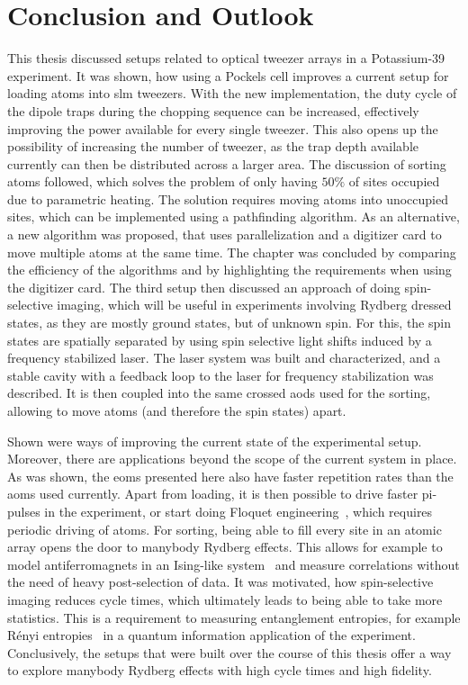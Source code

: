 \chapter{Conclusion and Outlook}

This thesis discussed setups related to optical tweezer arrays in a Potassium-39 experiment. It was shown, how using a Pockels cell improves a current setup for loading atoms into \ac{slm} tweezers. With the new implementation, the duty cycle of the dipole traps during the chopping sequence can be increased, effectively improving the power available for every single tweezer. This also opens up the possibility of increasing the number of tweezer, as the trap depth available currently can then be distributed across a larger area. The discussion of sorting atoms followed, which solves the problem of only having $50\%$ of sites occupied due to parametric heating. The solution requires moving atoms into unoccupied sites, which can be implemented using a pathfinding algorithm. As an alternative, a new algorithm was proposed, that uses parallelization and a digitizer card to move multiple atoms at the same time. The chapter was concluded by comparing the efficiency of the algorithms and by highlighting the requirements when using the digitizer card. The third setup then discussed an approach of doing spin-selective imaging, which will be useful in experiments involving Rydberg dressed states, as they are mostly ground states, but of unknown spin. For this, the spin states are spatially separated by using spin selective light shifts induced by a frequency stabilized laser. The laser system was built and characterized, and a stable cavity with a feedback loop to the laser for frequency stabilization was described. It is then coupled into the same crossed \acp{aod} used for the sorting, allowing to move atoms (and therefore the spin states) apart.

Shown were ways of improving the current state of the experimental setup. Moreover, there are applications beyond the scope of the current system in place. As was shown, the \acp{eom} presented here also have faster repetition rates than the \acp{aom} used currently. Apart from loading, it is then possible to drive faster pi-pulses in the experiment, or start doing Floquet engineering~\cite{Oka2019}, which requires periodic driving of atoms. For sorting, being able to fill every site in an atomic array opens the door to manybody Rydberg effects. This allows for example to model antiferromagnets in an Ising-like system~\cite{Lienhard2018} and measure correlations without the need of heavy post-selection of data. It was motivated, how spin-selective imaging reduces cycle times, which ultimately leads to being able to take more statistics. This is a requirement to measuring entanglement entropies, for example Rényi entropies~\cite{Wilde2014} in a quantum information application of the experiment. Conclusively, the setups that were built over the course of this thesis offer a way to explore manybody Rydberg effects with high cycle times and high fidelity.
